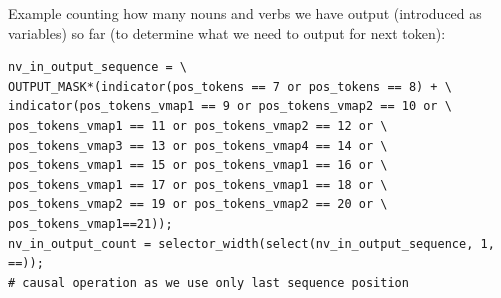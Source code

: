 \documentclass[11pt]{article}
\begin{document}
Example counting how many nouns and verbs we have output (introduced as variables) so far (to determine what we need to output for next token):
\begin{tiny}
\begin{verbatim}
nv_in_output_sequence = \
OUTPUT_MASK*(indicator(pos_tokens == 7 or pos_tokens == 8) + \
indicator(pos_tokens_vmap1 == 9 or pos_tokens_vmap2 == 10 or \
pos_tokens_vmap1 == 11 or pos_tokens_vmap2 == 12 or \
pos_tokens_vmap3 == 13 or pos_tokens_vmap4 == 14 or \
pos_tokens_vmap1 == 15 or pos_tokens_vmap1 == 16 or \
pos_tokens_vmap1 == 17 or pos_tokens_vmap1 == 18 or \
pos_tokens_vmap2 == 19 or pos_tokens_vmap2 == 20 or \
pos_tokens_vmap1==21));
nv_in_output_count = selector_width(select(nv_in_output_sequence, 1, ==));
# causal operation as we use only last sequence position
\end{verbatim}
\end{tiny}
\end{document}
